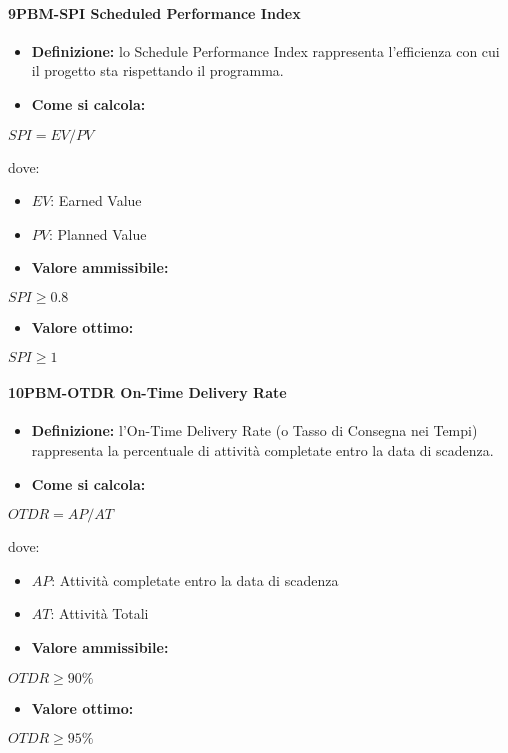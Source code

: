 \paragraph*{9PBM-SPI Scheduled Performance Index}
\begin{itemize}
    \item \textbf{Definizione:} lo Schedule Performance Index rappresenta l’efficienza con cui il progetto sta rispettando il programma.
    \item \textbf{Come si calcola:}
\end{itemize}
\begin{center}
   $SPI = EV/PV$ 
\end{center}
dove:
\begin{itemize}[label=$\rightarrow$]
    \item $EV$: Earned Value
    \item $PV$: Planned Value
\end{itemize}
\begin{itemize}
    \item \textbf{Valore ammissibile:}
\end{itemize}
\begin{center}
    $SPI \geq 0.8$
\end{center}
\begin{itemize}
    \item \textbf{Valore ottimo:}
\end{itemize}
\begin{center}
    $SPI \geq 1$
\end{center}

\paragraph*{10PBM-OTDR On-Time Delivery Rate}
\begin{itemize}
    \item \textbf{Definizione:} l’On-Time Delivery Rate (o Tasso di Consegna nei Tempi) rappresenta la percentuale di attività completate entro la data di scadenza.
    \item \textbf{Come si calcola:}
\end{itemize}
\begin{center}
   $OTDR = AP/AT$ 
\end{center}
dove:
\begin{itemize}[label=$\rightarrow$]
    \item $AP$: Attività completate entro la data di scadenza
    \item $AT$: Attività Totali
\end{itemize}
\begin{itemize}
    \item \textbf{Valore ammissibile:}
\end{itemize}
\begin{center}
    $OTDR \geq 90\%$
\end{center}
\begin{itemize}
    \item \textbf{Valore ottimo:}
\end{itemize}
\begin{center}
    $OTDR \geq 95\%$
\end{center}



